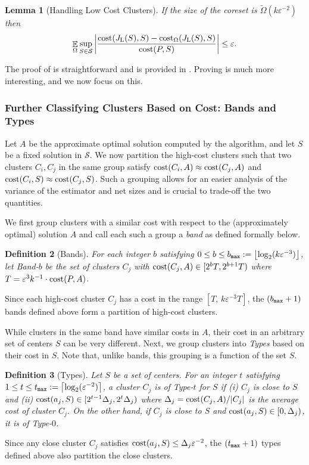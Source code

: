 \documentclass[11pt]{article}
\newtheorem{lemma}{Lemma}[section]
\newtheorem{definition}[lemma]{Definition}
\theoremstyle{restate}
\theoremstyle{definition}
\newcommand{\eps}{\ensuremath{\varepsilon}}
\newcommand{\ceil}[1]{{\left\lceil{#1}\right\rceil}}
\newcommand{\floor}[1]{{\left\lfloor{#1}\right\rfloor}}
\newcommand{\E}{\mathop{\mathbb{E}}}
\newcommand{\cost}{\textnormal{cost}}
\newcommand{\costom}{\cost_\Omega} %
\newcommand{\bmax}{b_\ensuremath{\textnormal{\texttt{max}}}}
\newcommand{\tmax}{t_\ensuremath{\textnormal{\texttt{max}}}}
\newcommand{\lowc}[1]{J_{\text{L}}(#1)}
\begin{document}
\begin{lemma}[Handling Low Cost Clusters]\label{lem: tiny-cluster}
If the size of the coreset is  $\tilde{\Omega}( k \eps^{-2})$ then
\begin{align} 
    \E_{ \Omega} \sup_{S \in \mathcal{S}} \left\lvert \frac{\cost(\lowc{S}, S) - \costom(\lowc{S},S)}{\cost(P,S) } \right\rvert \leq \eps.
\end{align}
\end{lemma}


The proof of  is straightforward and is provided in . Proving  is much more interesting, and we now focus on this.



\subsubsection{Further Classifying Clusters Based on Cost: Bands and Types}\label{sec:further-classifying}

Let $A$ be the approximate optimal solution computed by the algorithm, and let $S$ be a fixed solution in $\mathcal{S}$. We now partition the high-cost clusters such that two clusters $C_i, C_j$ in the same group satisfy  $\cost(C_i, A) \approx \cost(C_j, A)$ and $\cost(C_i, S) \approx \cost(C_j, S)$.   Such a grouping allows for an easier analysis of the variance of the estimator and net sizes and is crucial to trade-off the two quantities. 

We first group clusters with a similar cost with respect to the (approximately optimal) solution $A$ and call each such a group a \textit{band} as defined formally below.

\begin{definition}[Bands]
    For each integer $b$ satisfying $0 \leq b \leq \bmax := \floor{\log_2(k \eps^{-3})}$, let Band-$b$ be the set of clusters $C_j$ with  $\cost(C_j, A) \in [2^{b} T, 2^{b+1} T)$ where $T = \eps^3k^{-1} \cdot \cost(P,A)$. 
\end{definition}
Since each high-cost cluster $C_j$ has a cost in the range $[T,\,  k \eps^{-3}  T]$, the $(\bmax+1)$ bands defined above form a partition of high-cost clusters.

While clusters in the same band have similar costs in $A$, their cost in an arbitrary set of centers $S$ can be very different. 
Next, we group clusters into \textit{Types} based on their cost in $S$. 
Note that, unlike bands, this grouping is a function of the set $S$. 
\begin{definition}[Types]
Let $S$ be a set of centers. For an integer $t$ satisfying $1 \leq t \leq \tmax := \ceil{\log_2(\eps^{-2})}$, a cluster $C_j$ is of Type-$t$ for $S$ if (i) $C_j$ is close to $S$ and (ii) $\cost(a_j, S) \in [2^{t-1} \Delta_j, 2^{t} \Delta_j)$ where $\Delta_j = \cost(C_j, A) / |C_j|$ is the average cost of cluster $C_j$.  
On the other hand, if $C_j$ is close to $S$ and  $\cost(a_j, S) \in [0, \Delta_j)$, it is of Type-$0$.
\end{definition}
Since any close cluster $C_j$ satisfies $\cost(a_j, S) \leq \Delta_j \eps^{-2}$, the $(\tmax+1)$ types defined above also partition the close clusters. 
\end{document}
